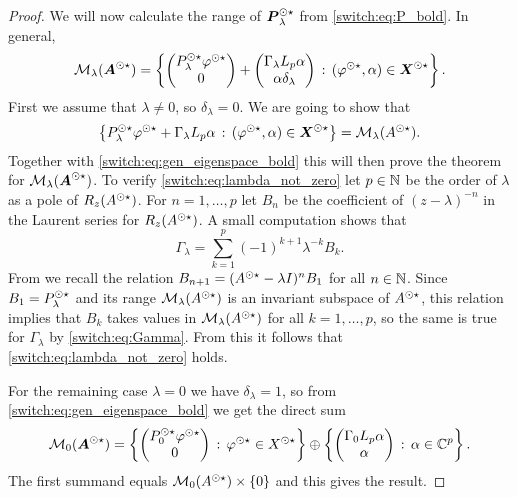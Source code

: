 \begin{proof}
  We will now calculate the range of $\boldsymbol{P}_{\lambda}^{\odot\star}$ from \cref{switch:eq:P_bold}. In general,
  \begin{equation}
    \label{switch:eq:gen_eigenspace_bold}
    \mathcal{M}_{\lambda}(\boldsymbol{A}^{\odot\star}) =
    \left\{
      \begin{pmatrix}
        P_{\lambda}^{\odot\star}\varphi^{\odot\star}\\
        0
      \end{pmatrix}
      +
      \begin{pmatrix}
        \Gamma_{\lambda}L_p\alpha\\
        \alpha\delta_{\lambda}
      \end{pmatrix}
      \,:\, (\varphi^{\odot\star},\alpha) \in \boldsymbol{X}^{\odot\star}
    \right\}.
  \end{equation}
  First we assume that $\lambda \neq 0$, so $\delta_{\lambda} = 0$. We are going to show that
   \begin{equation}\label{switch:eq:lambda_not_zero}
    \left\{P_{\lambda}^{\odot\star}\varphi^{\odot\star} + \Gamma_{\lambda}L_p\alpha \,:\, (\varphi^{\odot\star}, \alpha) \in \boldsymbol{X}^{\odot\star}\right\} = \mathcal{M}_{\lambda}(A^{\odot\star}).
  \end{equation}
   Together with \cref{switch:eq:gen_eigenspace_bold} this will then prove the theorem for $\mathcal{M}_{\lambda}(\boldsymbol{A}^{\odot\star})$. To verify \cref{switch:eq:lambda_not_zero} let $p \in \mathbb{N}$ be the order of $\lambda$ as a pole of $R_z(A^{\odot\star})$. For $n = 1,\ldots,p$ let $B_n$ be the coefficient of $(z - \lambda)^{-n}$ in the Laurent series for $R_z(A^{\odot\star})$. A small computation shows that
  \begin{equation}
    \label{switch:eq:Gamma}
    \Gamma_{\lambda} = \sum_{k=1}^p{(-1)^{k+1}\lambda^{-k}B_k}.
  \end{equation}
  From \cite[Section V.10]{Taylor1980} we recall the relation $B_{n+1} = (A^{\odot\star} - \lambda I)^n B_1$ for all $n \in \mathbb{N}$. Since $B_1 = P_{\lambda}^{\odot\star}$ and its range $\mathcal{M}_{\lambda}(A^{\odot\star})$ is an invariant subspace of $A^{\odot\star}$, this relation implies that $B_k$ takes values in $\mathcal{M}_{\lambda}(A^{\odot\star})$ for all $k = 1,\ldots,p$, so the same is true for $\Gamma_{\lambda}$ by \cref{switch:eq:Gamma}. From this it follows that \cref{switch:eq:lambda_not_zero} holds.
  \par
  For the remaining case $\lambda = 0$ we have $\delta_{\lambda} = 1$, so from \cref{switch:eq:gen_eigenspace_bold} we get the direct sum
  \[
    \mathcal{M}_0(\boldsymbol{A}^{\odot\star}) =
    \left\{
      \begin{pmatrix}
        P_0^{\odot\star}\varphi^{\odot\star}\\
        0
      \end{pmatrix}
      \,:\, \varphi^{\odot\star} \in X^{\odot\star}
    \right\}
    \oplus
    \left\{
      \begin{pmatrix}
        \Gamma_0L_p\alpha\\
        \alpha
      \end{pmatrix}
      \,:\, \alpha \in \mathbb{C}^p
    \right\}.
  \]
  The first summand equals $\mathcal{M}_0(A^{\odot\star}) \times \{0\}$ and this gives the result.
\end{proof}

